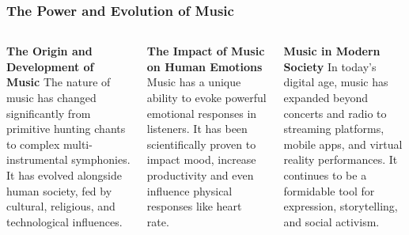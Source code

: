 \documentclass[5pt]{beamer}
\begin{document}
\begin{frame}
\frametitle{The Power and Evolution of Music}
\begin{columns}
\begin{column}{0.3\textwidth}
\begin{block}{\textbf{The Origin and Development of Music}}
The nature of music has changed significantly from primitive hunting chants to complex multi-instrumental symphonies. It has evolved alongside human society, fed by cultural, religious, and technological influences.
\end{block}
\end{column}
\begin{column}{0.3\textwidth}
\begin{block}{\textbf{The Impact of Music on Human Emotions}}
Music has a unique ability to evoke powerful emotional responses in listeners. It has been scientifically proven to impact mood, increase productivity and even influence physical responses like heart rate.
\end{block}
\end{column}
\begin{column}{0.3\textwidth}
\begin{block}{\textbf{Music in Modern Society}}
In today's digital age, music has expanded beyond concerts and radio to streaming platforms, mobile apps, and virtual reality performances. It continues to be a formidable tool for expression, storytelling, and social activism.
\end{block}
\end{column}
\end{columns}
\end{frame}
\end{document}

